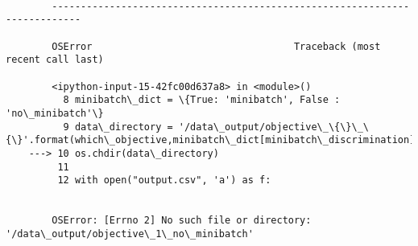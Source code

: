 \documentclass[11pt]{article}
\begin{document}
    \begin{Verbatim}[commandchars=\\\{\}]

        ---------------------------------------------------------------------------

        OSError                                   Traceback (most recent call last)

        <ipython-input-15-42fc00d637a8> in <module>()
          8 minibatch\_dict = \{True: 'minibatch', False : 'no\_minibatch'\}
          9 data\_directory = '/data\_output/objective\_\{\}\_\{\}'.format(which\_objective,minibatch\_dict[minibatch\_discrimination])
    ---> 10 os.chdir(data\_directory)
         11 
         12 with open("output.csv", 'a') as f:


        OSError: [Errno 2] No such file or directory: '/data\_output/objective\_1\_no\_minibatch'

    \end{Verbatim}


    
    
    
    
\end{document}
